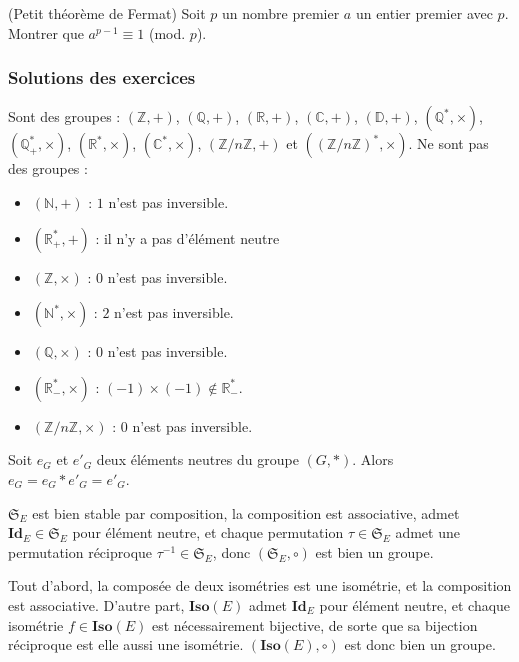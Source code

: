 \begin{exo}(Petit théorème de Fermat)
Soit $p$ un nombre premier $a$ un entier premier avec $p$.
Montrer que $a^{p-1} \equiv 1$ (mod. $p$).
\end{exo}

\subsubsection{Solutions des exercices}

\begin{sol}
Sont des groupes :
$(\mathbb{Z}, +)$,
$(\mathbb{Q}, +)$,
$(\mathbb{R}, +)$,
$(\mathbb{C}, +)$,
$(\mathbb{D}, +)$,
$(\mathbb{Q}^\ast, \times)$,
$(\mathbb{Q}_+^\ast, \times)$,
$(\mathbb{R}^\ast, \times)$,
$(\mathbb{C}^\ast, \times)$,
$(\mathbb{Z}/n\mathbb{Z}, +)$ et
$((\mathbb{Z}/n\mathbb{Z})^\ast, \times)$.
Ne sont pas des groupes :
\begin{itemize}
\item $(\mathbb{N}, +)$ : $1$ n'est pas inversible.
\item $(\mathbb{R}_+^\ast, +)$ : il n'y a pas d'élément neutre
\item $(\mathbb{Z}, \times)$ : $0$ n'est pas inversible.
\item $(\mathbb{N}^\ast, \times)$ : $2$ n'est pas inversible.
\item $(\mathbb{Q}, \times)$ : $0$ n'est pas inversible.
\item $(\mathbb{R}_-^\ast, \times)$ : $(-1) \times (-1) \notin \mathbb{R}_-^\ast$.
\item $(\mathbb{Z}/n\mathbb{Z}, \times)$ : $0$ n'est pas inversible.
\end{itemize}
\end{sol}

\begin{sol}
Soit $e_G$ et $e'_G$ deux éléments neutres du groupe $(G, \ast)$.
Alors $e_G = e_G \ast e'_G = e'_G$.
\end{sol}

\begin{sol}
$\mathfrak{S}_E$ est bien stable par composition,
la composition est associative,
admet $\mathbf{Id}_E \in \mathfrak{S}_E$ pour élément neutre,
et chaque permutation $\tau \in \mathfrak{S}_E$
admet une permutation réciproque $\tau^{-1} \in \mathfrak{S}_E$,
donc $(\mathfrak{S}_E, \circ)$ est bien un groupe.
\end{sol}

\begin{sol}
Tout d'abord, la composée de deux isométries est une isométrie, et la composition est associative.
D'autre part, $\mathbf{Iso}(E)$ admet $\mathbf{Id}_E$ pour élément neutre, et
chaque isométrie $f \in \mathbf{Iso}(E)$ est nécessairement bijective,
de sorte que sa bijection réciproque est elle aussi une isométrie.
$(\mathbf{Iso}(E),\circ)$ est donc bien un groupe.
\end{sol}

